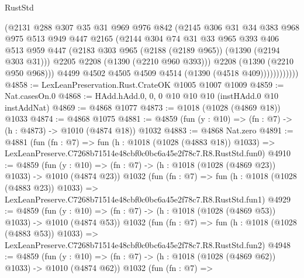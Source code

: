 \begin{lexlean}{RustStd}
\begin{coremodule}
                      (@2131
                        @288
                        @307
                        @35
                        @31
                        @969
                        @976
                        @842
                        (@2145
                          @306
                          @31
                          @34
                          @383
                          @968
                          @975
                          @513
                          @949
                          @447
                          @2165
                          (@2144
                            @304
                            @74
                            @31
                            @33
                            @965
                            @393
                            @406
                            @513
                            @959
                            @447
                            (@2183 @303 @965 (@2188 (@2189 @965)) (@1390 (@2194 @303 @31)))
                            @2205
                            @2208
                            (@1390 (@2210 @960 @393)))
                          @2208
                          (@1390 (@2210 @950 @968)))
                        @4499
                        @4502
                        @4505
                        @4509
                        @4514
                        (@1390 (@4518 @409))))))))))))
@4858 := LexLeanPreservation.Rust.CrateOK @1005 @1007 @1009
@4859 := Nat.casesOn.{0}
@4868 := HAdd.hAdd.{0, 0, 0} @10 @10 @10 (instHAdd.{0} @10 instAddNat)
@4869 := @4868 @1077
@4873 := @1018 (@1028 (@4869 @18)) @1033
@4874 := @4868 @1075
@4881 := @4859 (fun (y : @10) => (fn : @7) -> (h : @4873) -> @1010 (@4874 @18)) @1032
@4883 := @4868 Nat.zero
@4891 := @4881
    (fun (fn : @7) =>
    fun (h : @1018 (@1028 (@4883 @18)) @1033) =>
    LexLeanPreserve.C7268b71514e48cbf0c0bc6a45e2f78c7.R8.RustStd.fun0)
@4910 := @4859
    (fun (y : @10) => (fn : @7) -> (h : @1018 (@1028 (@4869 @23)) @1033) -> @1010 (@4874 @23))
    @1032
    (fun (fn : @7) =>
    fun (h : @1018 (@1028 (@4883 @23)) @1033) =>
    LexLeanPreserve.C7268b71514e48cbf0c0bc6a45e2f78c7.R8.RustStd.fun1)
@4929 := @4859
    (fun (y : @10) => (fn : @7) -> (h : @1018 (@1028 (@4869 @53)) @1033) -> @1010 (@4874 @53))
    @1032
    (fun (fn : @7) =>
    fun (h : @1018 (@1028 (@4883 @53)) @1033) =>
    LexLeanPreserve.C7268b71514e48cbf0c0bc6a45e2f78c7.R8.RustStd.fun2)
@4948 := @4859
    (fun (y : @10) => (fn : @7) -> (h : @1018 (@1028 (@4869 @62)) @1033) -> @1010 (@4874 @62))
    @1032
    (fun (fn : @7) =>

\end{coremodule}
\end{lexlean}
